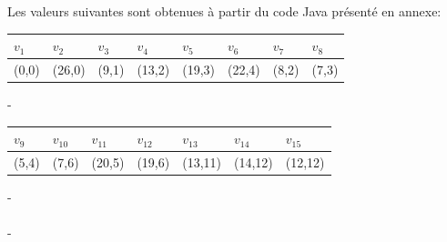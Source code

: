 \documentclass[hidelinks,letterpaper,12pt]{article}
\begin{document}
Les valeurs suivantes sont obtenues à partir du code Java présenté en annexe: \\
\begin{tabularx}{\textwidth}{|*{8}{X|}}
\hline
$v_1$ & $v_2$  & $v_3$ & $v_4$  & $v_5$  & $v_6$  & $v_7$ & $v_8$ \\
\hline 
(0,0) & (26,0) & (9,1) & (13,2) & (19,3) & (22,4) & (8,2) & (7,3) \\
\hline
\end{tabularx}
{\color{white}-}
\\
\begin{tabularx}{\textwidth}{|*{7}{X|}}
\hline
$v_9$ & $v_{10}$ & $v_{11}$ & $v_{12}$ & $v_{13}$ & $v_{14}$ & $v_{15}$ \\
\hline 
(5,4) & (7,6)    & (20,5)   & (19,6)   & (13,11)  & (14,12)   & (12,12) \\
\hline
\end{tabularx}
{\color{white}-}
\\ \\
{\color{white}-}

\end{document}
